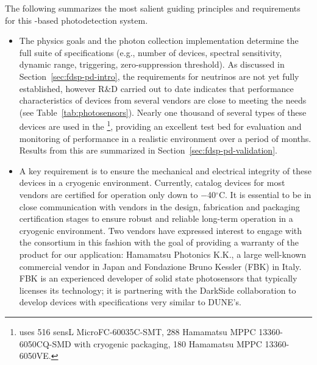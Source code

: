 The following summarizes the most salient guiding principles and requirements for this -based photodetection system.

\begin{itemize}
\item  The physics goals and the photon collection implementation determine the full suite of  %
specifications (e.g., number of devices, spectral sensitivity, dynamic range, triggering, zero-suppression threshold).  As discussed in Section~\ref{sec:fdsp-pd-intro},  the requirements for  neutrinos are not yet fully established, however R\&D carried out to date indicates that  
performance characteristics of devices from several vendors are close to meeting the %
 needs (see Table~\ref{tab:photosensors}). 
Nearly one thousand of several types of these devices are used in the  \footnote{  uses 516 sensL MicroFC-60035C-SMT, 288 Hamamatsu MPPC 13360-6050CQ-SMD with cryogenic packaging, 180 Hamamatsu MPPC 13360-6050VE.},  %
providing an excellent test bed for evaluation and monitoring of  performance in a realistic environment over a period of months. Results from this are summarized in Section~\ref{sec:fdsp-pd-validation}.

\item A key requirement is to ensure the mechanical and electrical integrity of these devices in a cryogenic environment. %
Currently, catalog devices for most vendors are certified for operation only down to \num{-40}$^\circ$C. It is essential to be in close communication with  vendors in the %
 design, fabrication and packaging certification stages to ensure %
robust and reliable long-term operation in a cryogenic environment. 
Two %
vendors have expressed interest to engage with the consortium in this fashion
with the goal of %
providing a warranty of the product for our application: Hamamatsu Photonics K.K., a large well-known commercial vendor in Japan and Fondazione Bruno Kessler (FBK) in Italy. FBK is an experienced developer of solid state photosensors that typically licenses its technology;  it is partnering with the DarkSide collaboration to develop devices with specifications very similar %
to DUNE's. 


\end{itemize}
